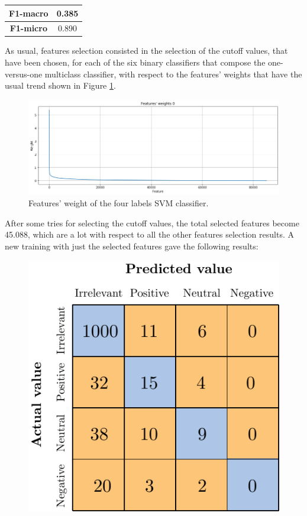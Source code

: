 \begin{center}
	\begin{tabular}{ | c | c | } 
		\hline
		\textbf{F1-macro} & 0.385 \\
		\hline
		\textbf{F1-micro} & 0.890 \\ 
		\hline
	\end{tabular}
\end{center}

As usual, features selection consisted in the selection of the cutoff values, that have been chosen, for each of the six binary classifiers that compose the one-versus-one multiclass classifier, with respect to the features' weights that have the usual trend shown in Figure \ref{fig:svm4l_fs_1}.
\begin{figure}[H]
	\centering
	\includegraphics[width=\textwidth]{figures/conf_matrices/ita_4l_svm/svm4l_fs_1.png}
	\caption{Features' weight of the four labels SVM classifier.}
	\label{fig:svm4l_fs_1}
\end{figure}


After some tries for selecting the cutoff values, the total selected features become 45.088, which are a lot with respect to all the other features selection results. A new training with just the selected features gave the following results:

\begin{figure}[H]
	\centering
	\includegraphics[scale=1]{figures/conf_matrices/ita_4l_svm/ita_4l_svm_afs.pdf}
	\label{fig:ita_4l_svm_afs}
\end{figure}

